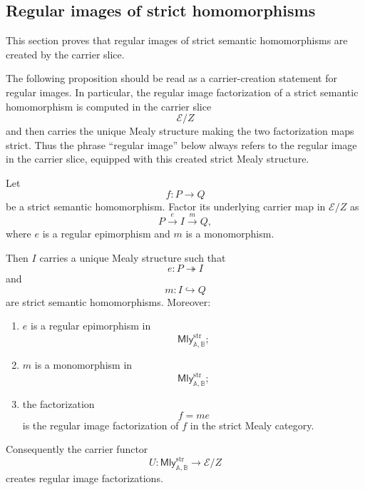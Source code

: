 \subsection{Regular images of strict homomorphisms}
\label{subsec:regular-images-strict-homomorphisms}

This section proves that regular images of strict semantic homomorphisms are
created by the carrier slice.

The following proposition should be read as a carrier-creation statement for
regular images. In particular, the regular image factorization of a strict
semantic homomorphism is computed in the carrier slice
\[
    \mathcal E/Z
\]
and then carries the unique Mealy structure making the two factorization maps
strict. Thus the phrase ``regular image'' below always refers to the regular
image in the carrier slice, equipped with this created strict Mealy structure.

\begin{proposition}
\label{prop:regular-image-factorization-mealy}
    Let
    \[
        f:P\to Q
    \]
    be a strict semantic homomorphism. Factor its underlying carrier map in
    \(\mathcal E/Z\) as
    \[
        P\xrightarrow{e}I\xrightarrow{m}Q,
    \]
    where \(e\) is a regular epimorphism and \(m\) is a monomorphism.

    Then \(I\) carries a unique Mealy structure such that
    \[
        e:P\twoheadrightarrow I
    \]
    and
    \[
        m:I\hookrightarrow Q
    \]
    are strict semantic homomorphisms. Moreover:

    \begin{enumerate}
        \item \(e\) is a regular epimorphism in
        \[
            \mathsf{Mly}^{\mathrm{str}}_{\mathbb A,\mathbb B};
        \]

        \item \(m\) is a monomorphism in
        \[
            \mathsf{Mly}^{\mathrm{str}}_{\mathbb A,\mathbb B};
        \]

        \item the factorization
        \[
            f=me
        \]
        is the regular image factorization of \(f\) in the strict Mealy
        category.
    \end{enumerate}

    Consequently the carrier functor
    \[
        U:
        \mathsf{Mly}^{\mathrm{str}}_{\mathbb A,\mathbb B}
        \to
        \mathcal E/Z
    \]
    creates regular image factorizations.
\end{proposition}

